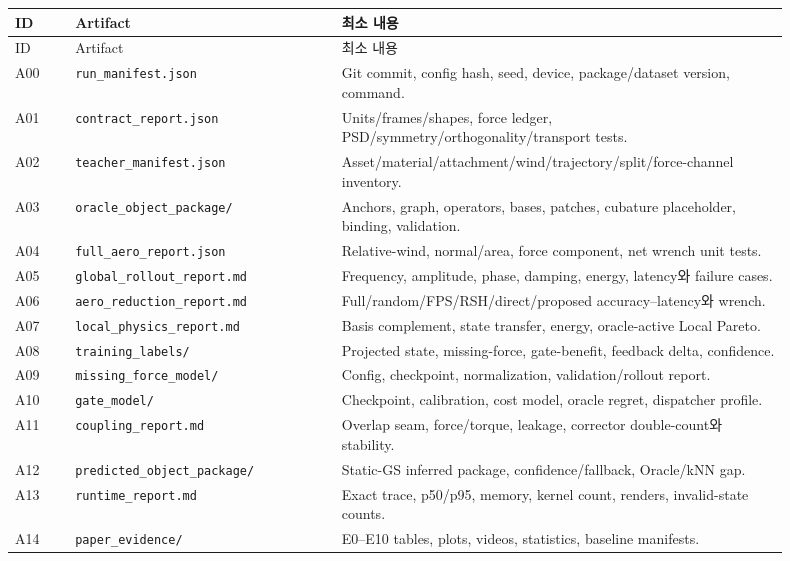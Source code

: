 \documentclass[10pt,a4paper]{article}
\newcommand{\artifact}[1]{\textcolor{ProgressBlue}{\nolinkurl{#1}}}
\begin{document}
\begin{longtable}{L{0.075\linewidth}L{0.31\linewidth}L{0.52\linewidth}}
\toprule
ID & Artifact & 최소 내용 \\
\midrule
\endfirsthead
\toprule
ID & Artifact & 최소 내용 \\
\midrule
\endhead
A00 & \artifact{run_manifest.json} & Git commit, config hash, seed, device, package/dataset version, command. \\
A01 & \artifact{contract_report.json} & Units/frames/shapes, force ledger, PSD/symmetry/orthogonality/transport tests. \\
A02 & \artifact{teacher_manifest.json} & Asset/material/attachment/wind/trajectory/split/force-channel inventory. \\
A03 & \artifact{oracle_object_package/} & Anchors, graph, operators, bases, patches, cubature placeholder, binding, validation. \\
A04 & \artifact{full_aero_report.json} & Relative-wind, normal/area, force component, net wrench unit tests. \\
A05 & \artifact{global_rollout_report.md} & Frequency, amplitude, phase, damping, energy, latency와 failure cases. \\
A06 & \artifact{aero_reduction_report.md} & Full/random/FPS/RSH/direct/proposed accuracy--latency와 wrench. \\
A07 & \artifact{local_physics_report.md} & Basis complement, state transfer, energy, oracle-active Local Pareto. \\
A08 & \artifact{training_labels/} & Projected state, missing-force, gate-benefit, feedback delta, confidence. \\
A09 & \artifact{missing_force_model/} & Config, checkpoint, normalization, validation/rollout report. \\
A10 & \artifact{gate_model/} & Checkpoint, calibration, cost model, oracle regret, dispatcher profile. \\
A11 & \artifact{coupling_report.md} & Overlap seam, force/torque, leakage, corrector double-count와 stability. \\
A12 & \artifact{predicted_object_package/} & Static-GS inferred package, confidence/fallback, Oracle/kNN gap. \\
A13 & \artifact{runtime_report.md} & Exact trace, p50/p95, memory, kernel count, renders, invalid-state counts. \\
A14 & \artifact{paper_evidence/} & E0--E10 tables, plots, videos, statistics, baseline manifests. \\
\bottomrule
\end{longtable}
\end{document}
